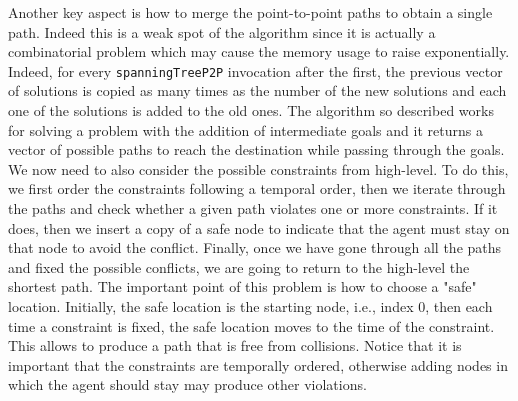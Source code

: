 Another key aspect is how to merge the point-to-point paths to obtain a single
path. Indeed this is a weak spot of the algorithm since it is actually a
combinatorial problem which may cause the memory usage to raise exponentially.
Indeed, for every \texttt{spanningTreeP2P} invocation after the first, the
previous vector of solutions is copied as many times as the number of the new
solutions and each one of the solutions is added to the old ones. \newline
The algorithm so described works for solving a  problem with the
addition of intermediate goals and it returns a vector of possible paths to
reach the destination while passing through the goals. We now need to also 
consider the possible constraints from high-level. To do this, we first order
the constraints following a temporal order, then we iterate through the paths 
and check whether a given path violates one or more constraints. If it does,
then we insert a copy of a safe node to indicate that the agent must stay on
that node to avoid the conflict. Finally, once we have gone through all the
paths and fixed the possible conflicts, we are going to return to the
high-level the shortest path. \newline
The important point of this problem is how to choose a "safe" location.
Initially, the safe location is the starting node, i.e., index 0, then each
time a constraint is fixed, the safe location moves to the time of the
constraint. This allows to produce a path that is free from collisions. Notice
that it is important that the constraints are temporally ordered, otherwise
adding nodes in which the agent should stay may produce other violations. 
%
